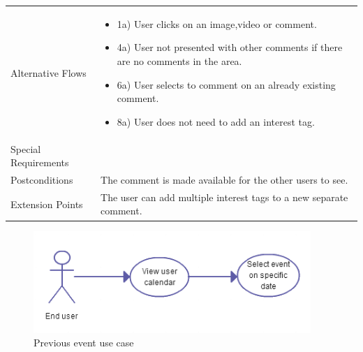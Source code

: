 \begin{minipage}{\linewidth}
\begin{tabular}{|l|p{85mm}|}
  \hline
  Alternative Flows & 
    \begin{itemize}
      \item 1a) User clicks on an image,video or comment.
      \item 4a) User not presented with other comments if there are no comments in the area.
      \item 6a) User selects to comment on an already existing comment.
      \item 8a) User does not need to add an interest tag.
    \end{itemize} \\
  Special Requirements & \\
  Postconditions & The comment is made available for the other users to see.\\
  Extension Points & The user can add multiple interest tags to a new separate comment.\\
  \hline
\end{tabular}
\end{minipage}

\begin{figure}[ht!]
\centering
\includegraphics[width=105mm]{./SystemRequirements/img/preveventUC.png}
\caption{Previous event use case \label{fig:SysReqUseCasesEventPrev}}
\end{figure}

